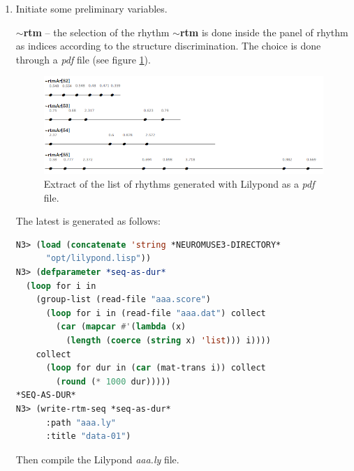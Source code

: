 \begin{enumerate}
 \item Initiate some preliminary variables.


\textbf{$\sim$rtm} -- the selection of the rhythm \textbf{$\sim$rtm} is done inside the panel of rhythm as indices according to the structure discrimination. The choice is done through a \textsl{pdf} file (see figure \ref{rtm}). 

\bigskip 

 \begin{figure}[htbp]
\begin{center}
\includegraphics[scale=0.44]{img/6710} 
\caption{Extract of the list of rhythms generated with Lilypond as a \textsl{pdf} file.}
\label{rtm}
\end{center}
\end{figure}
 
The latest is generated as follows:
 \begin{lstlisting}[basicstyle=\footnotesize\ttfamily,language=Lisp]
N3> (load (concatenate 'string *NEUROMUSE3-DIRECTORY* 
      "opt/lilypond.lisp"))
N3> (defparameter *seq-as-dur* 
  (loop for i in 
    (group-list (read-file "aaa.score") 
      (loop for i in (read-file "aaa.dat") collect 
        (car (mapcar #'(lambda (x) 
          (length (coerce (string x) 'list))) i)))) 
    collect 
      (loop for dur in (car (mat-trans i)) collect 
        (round (* 1000 dur)))))
*SEQ-AS-DUR*
N3> (write-rtm-seq *seq-as-dur* 
      :path "aaa.ly" 
      :title "data-01")
\end{lstlisting}
Then compile the Lilypond \textsl{aaa.ly} file.%


\end{enumerate}
